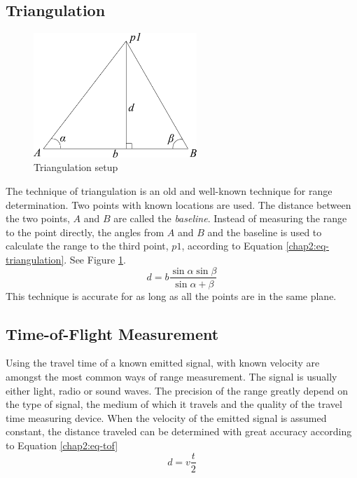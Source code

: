 \subsection{Triangulation}
\begin{figure}[htbp]
    \centering
    \includegraphics[width=0.55\textwidth]{pics/triangulation}
    \caption{Triangulation setup}
    \label{chap2:fig-triangulation}
\end{figure}
The technique of triangulation is an old and well-known technique for range determination.
Two points with known locations are used. The distance between the two points, $A$ and $B$ are called
the \emph{baseline}. Instead of measuring the range to the point directly, the angles
from $A$ and $B$ and the baseline is used to calculate the range to the third point, $p1$,
according to Equation \ref{chap2:eq-triangulation}. See Figure
\ref{chap2:fig-triangulation}. 
\begin{equation}
    \label{chap2:eq-triangulation}
    d = b \frac{\sin{\alpha} \sin{\beta}}{\sin{\alpha + \beta}}
\end{equation}
This technique is accurate for as long as all the points are in the same plane.\cite{triangulation}


\subsection{Time-of-Flight Measurement}
Using the travel time of a known emitted signal, with known velocity are amongst the most
common ways of range measurement. 
The signal is usually either light, radio or sound waves. The precision of the
range greatly depend on the type of signal, the medium of which it travels and the quality of
the travel time measuring device. When the velocity of the emitted signal is assumed constant, 
the distance traveled can be determined with great accuracy according to Equation \eqref{chap2:eq-tof}
\begin{equation}
    \label{chap2:eq-tof}
    d = v \frac{t}{2}
\end{equation}




